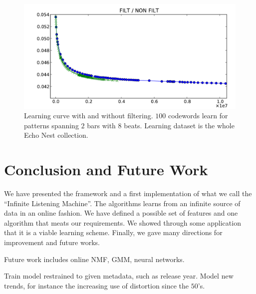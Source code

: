 \documentclass{sig-alternate}
\begin{document}
\begin{figure}[thb]
\begin{center}
\includegraphics[width=.99\columnwidth]{filt_nonfilt}
\end{center}
\caption{\small{
Learning curve with and without filtering. $100$ codewords learn for
patterns spanning $2$ bars with $8$ beats. Learning dataset is the
whole Echo Nest collection.
}}
\label{fig:filt}
\end{figure}

\section{Conclusion and Future Work}
We have presented the framework and a first implementation of what
we call the ``Infinite Listening Machine''. The algorithms learns from
an infinite source of data in an online fashion. We have defined a
possible set of features and one algorithm that meats our requirements.
We showed through some application that it is a viable learning scheme.
Finally, we gave many directions for improvement and future works.

Future work includes online NMF, GMM, neural networks.

Train model restrained to given metadata, such as release year.
Model new trends, for instance the increasing use of distortion
since the $50$'s.


%

%
\end{document}
